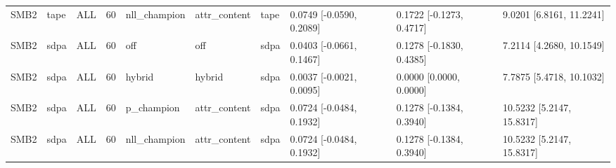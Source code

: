 \begin{tabular}{llllllllll}
SMB2 & tape & ALL & 60 & nll\_champion & attr\_content & tape & 0.0749 [-0.0590, 0.2089] & 0.1722 [-0.1273, 0.4717] & 9.0201 [6.8161, 11.2241] \\
SMB2 & sdpa & ALL & 60 & off & off & sdpa & 0.0403 [-0.0661, 0.1467] & 0.1278 [-0.1830, 0.4385] & 7.2114 [4.2680, 10.1549] \\
SMB2 & sdpa & ALL & 60 & hybrid & hybrid & sdpa & 0.0037 [-0.0021, 0.0095] & 0.0000 [0.0000, 0.0000] & 7.7875 [5.4718, 10.1032] \\
SMB2 & sdpa & ALL & 60 & p\_champion & attr\_content & sdpa & 0.0724 [-0.0484, 0.1932] & 0.1278 [-0.1384, 0.3940] & 10.5232 [5.2147, 15.8317] \\
SMB2 & sdpa & ALL & 60 & nll\_champion & attr\_content & sdpa & 0.0724 [-0.0484, 0.1932] & 0.1278 [-0.1384, 0.3940] & 10.5232 [5.2147, 15.8317] \\
\hline
\end{tabular}
